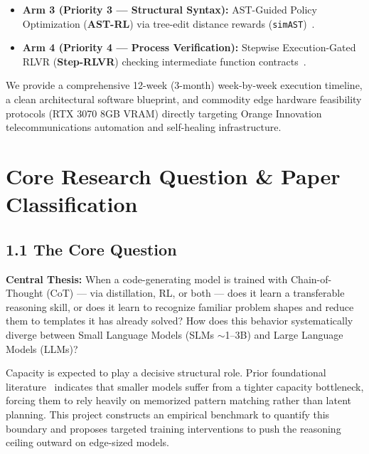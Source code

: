 \documentclass[12pt, a4paper]{article}
\begin{document}
\begin{researchbox}[title={Executive Abstract}]
\begin{enumerate}[leftmargin=1.5em]
\begin{itemize}
    \item \textbf{Arm 3 (Priority 3 --- Structural Syntax):} AST-Guided Policy Optimization (\textbf{AST-RL}) via tree-edit distance rewards (\texttt{simAST})~\cite{treediff, veriseek}.
    \item \textbf{Arm 4 (Priority 4 --- Process Verification):} Stepwise Execution-Gated RLVR (\textbf{Step-RLVR}) checking intermediate function contracts~\cite{codeprm, execverify}.
  \end{itemize}
\end{enumerate}

We provide a comprehensive 12-week (3-month) week-by-week execution timeline, a clean architectural software blueprint, and commodity edge hardware feasibility protocols (RTX 3070 8GB VRAM) directly targeting Orange Innovation telecommunications automation and self-healing infrastructure.
\end{researchbox}

\vspace{0.5cm}
\tableofcontents
\newpage

\section{Core Research Question \& Paper Classification}

\subsection{1.1 The Core Question}

\begin{keybox}
\textbf{Central Thesis:} When a code-generating model is trained with Chain-of-Thought (CoT) --- via distillation, RL, or both --- does it learn a transferable reasoning skill, or does it learn to recognize familiar problem shapes and reduce them to templates it has already solved? How does this behavior systematically diverge between Small Language Models (SLMs $\sim$1--3B) and Large Language Models (LLMs)?
\end{keybox}

Capacity is expected to play a decisive structural role. Prior foundational literature~\cite{too_big_to_think} indicates that smaller models suffer from a tighter capacity bottleneck, forcing them to rely heavily on memorized pattern matching rather than latent planning. This project constructs an empirical benchmark to quantify this boundary and proposes targeted training interventions to push the reasoning ceiling outward on edge-sized models.
\end{document}
